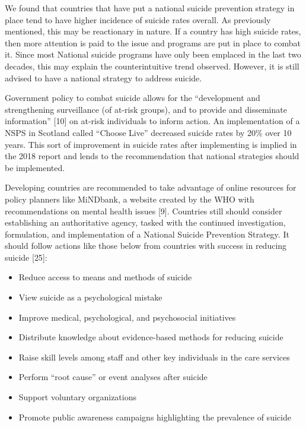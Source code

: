 \documentclass[]{article}
\begin{document}
We found that countries that have put a national suicide prevention
strategy in place tend to have higher incidence of suicide rates
overall. As previously mentioned, this may be reactionary in nature. If
a country has high suicide rates, then more attention is paid to the
issue and programs are put in place to combat it. Since most National
suicide programs have only been emplaced in the last two decades, this
may explain the counterintuitive trend observed. However, it is still
advised to have a national strategy to address suicide.

Government policy to combat suicide allows for the ``development and
strengthening surveillance (of at-risk groups), and to provide and
disseminate information'' {[}10{]} on at-risk individuals to inform
action. An implementation of a NSPS in Scotland called ``Choose Live''
decreased suicide rates by 20\% over 10 years. This sort of improvement
in suicide rates after implementing is implied in the 2018 report and
lends to the recommendation that national strategies should be
implemented.

Developing countries are recommended to take advantage of online
resources for policy planners like MiNDbank, a website created by the
WHO with recommendations on mental health issues {[}9{]}. Countries
still should consider establishing an authoritative agency, tasked with
the continued investigation, formulation, and implementation of a
National Suicide Prevention Strategy. It should follow actions like
those below from countries with success in reducing suicide {[}25{]}:

\begin{itemize}
  \item Reduce access to means and methods of suicide 
  \item View suicide as a psychological mistake
  \item Improve medical, psychological, and psychosocial initiatives
  \item Distribute knowledge about evidence-based methods for reducing suicide
  \item Raise skill levels among staff and other key individuals in the care services
  \item Perform “root cause” or event analyses after suicide
  \item Support voluntary organizations 
  \item Promote public awareness campaigns highlighting the prevalence of suicide
\end{itemize}
\end{document}
